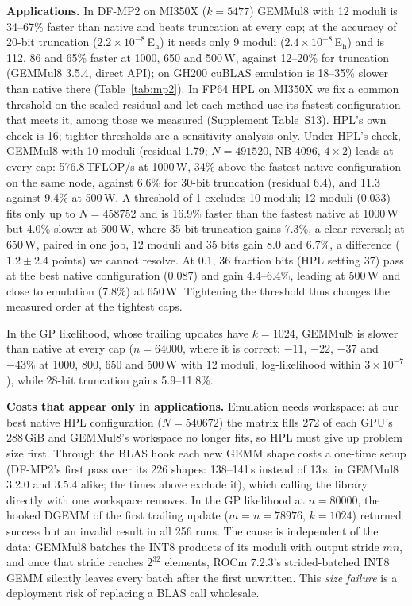 \documentclass[conference]{IEEEtran}
\newcommand{\W}{\,W}
\newcommand{\Eh}{\,E$_\mathrm{h}$}
\newcommand{\ee}[2]{#1{\times}10^{#2}}  %
\newcommand{\pct}{\%}
\begin{document}
\textbf{Applications.} In DF-MP2 on MI350X ($k=5477$) GEMMul8 with 12 moduli is 34--67\pct{} faster than native and beats
truncation at every cap; at the accuracy of 20-bit truncation ($\ee{2.2}{-8}$\Eh) it needs only 9 moduli
($\ee{2.4}{-8}$\Eh) and is 112, 86 and 65\pct{} faster at 1000, 650 and 500\W, against 12--20\pct{} for truncation
(GEMMul8 3.5.4, direct API); on GH200
cuBLAS emulation is 18--35\pct{} slower than native there (Table~\ref{tab:mp2}). In FP64 HPL on MI350X we fix a common threshold on the scaled residual and let each method use its fastest
configuration that meets it, among those we measured (Supplement Table~S13). HPL's own check is 16; tighter thresholds
are a sensitivity analysis only. Under HPL's check, GEMMul8 with 10 moduli (residual 1.79; $N=491520$, NB 4096,
$4\times2$) leads at every cap: 576.8\,TFLOP/s at 1000\W, 34\pct{} above the fastest native configuration on the same
node, against 6.6\pct{} for 30-bit truncation (residual 6.4), and 11.3 against 9.4\pct{} at 500\W. A threshold of 1 excludes 10 moduli;
12 moduli (0.033) fits only up to $N=458752$ and is 16.9\pct{} faster than the fastest native at 1000\W{} but 4.0\pct{}
slower at 500\W, where 35-bit truncation gains 7.3\pct, a clear reversal; at 650\W, paired in one job, 12 moduli and
35 bits gain 8.0 and 6.7\pct, a difference ($1.2\pm2.4$ points) we cannot resolve. At 0.1, 36 fraction bits (HPL setting 37) pass at the best
native configuration (0.087) and gain 4.4--6.4\pct, leading at 500\W{} and close to emulation (7.8\pct) at 650\W. Tightening the
threshold thus changes the measured order at the tightest caps.

In the GP
likelihood, whose trailing updates have $k=1024$, GEMMul8 is slower than native at every cap ($n=64000$, where it is
correct: $-11$, $-22$, $-37$ and $-43\pct$ at 1000, 800, 650 and 500\W{} with 12 moduli, log-likelihood within
$\ee{3}{-7}$), while 28-bit truncation gains 5.9--11.8\pct.

\textbf{Costs that appear only in applications.} Emulation needs workspace: at our best native HPL configuration
($N=540672$) the matrix fills 272 of each GPU's 288\,GiB and GEMMul8's workspace no longer fits, so HPL must give up
problem size first. Through the BLAS hook each new GEMM shape costs a one-time setup (DF-MP2's first pass over its 226
shapes: 138--141\,s instead of 13\,s, in GEMMul8 3.2.0 and 3.5.4 alike; the times above exclude it), which calling the
library directly with one workspace removes. In the GP likelihood at $n=80000$, the hooked DGEMM of the first trailing update
($m=n=78976$, $k=1024$) returned success but an invalid result in all 256 runs. The cause is independent of the data:
GEMMul8 batches the INT8 products of its moduli with output stride $mn$, and once that stride reaches $2^{32}$ elements,
ROCm 7.2.3's strided-batched INT8 GEMM silently leaves every batch after the first unwritten. This \emph{size failure}
is a deployment risk of replacing a BLAS call wholesale.
\end{document}
